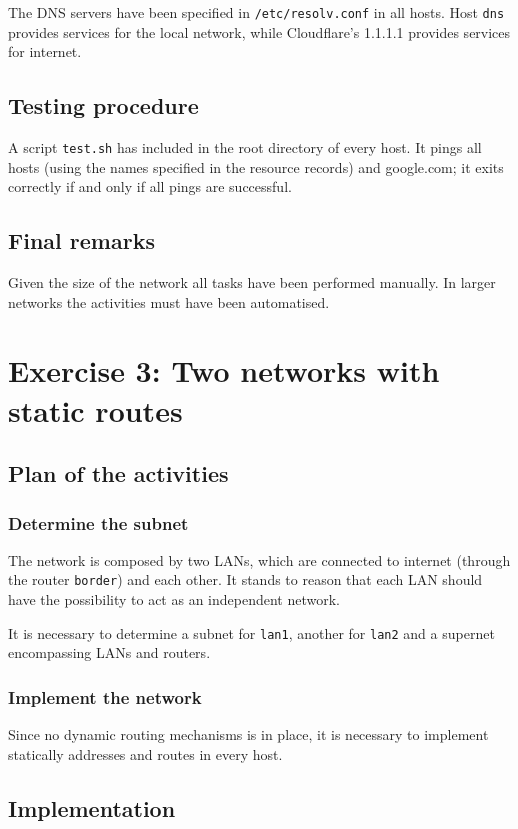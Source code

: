 \documentclass{homework}
\newcommand{\mt}{\texttt}
\begin{document}
    The DNS servers have been specified in \mt{/etc/resolv.conf} in all hosts. Host \mt{dns} provides services for the local network, while Cloudflare's 1.1.1.1 provides services for internet.
      
    \subsection{Testing procedure}
    A script \mt{test.sh} has included in the root directory of every host. It pings all hosts (using the names specified in the resource records) and google.com; it exits correctly if and only if all pings are successful.
    
    \subsection{Final remarks}
    Given the size of the network all tasks have been performed manually. In larger networks the activities must have been automatised.
    
    
    \section{Exercise 3: Two networks with static routes}
    
    \subsection{Plan of the activities}
    
    \subsubsection{Determine the subnet}
    The network is composed by two LANs, which are connected to internet (through the router \mt{border}) and each other. It stands to reason that each LAN should have the possibility to act as an independent network.
    
    It is necessary to determine a subnet for \mt{lan1}, another for \mt{lan2} and a supernet encompassing LANs and routers.
    
    \subsubsection{Implement the network}
    Since no dynamic routing mechanisms is in place, it is necessary to implement statically addresses and routes in every host.
    
    \subsection{Implementation}
    
\end{document}
